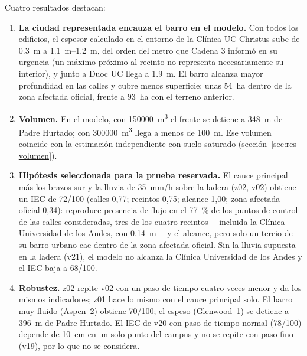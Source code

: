 Cuatro resultados destacan:
\begin{enumerate}
\item \textbf{La ciudad representada encauza el barro en el modelo.} Con todos los edificios, el espesor calculado en el entorno de la Clínica UC Christus sube de \SI{0,3}{m} a \SIrange{1,1}{1,2}{m}, del orden del metro que Cadena 3 informó en su urgencia (un máximo próximo al recinto no representa necesariamente su interior), y junto a Duoc UC llega a \SI{1,9}{m}. El barro alcanza mayor profundidad en las calles y cubre menos superficie: unas \SI{54}{ha} dentro de la zona afectada oficial, frente a \SI{93}{ha} con el terreno anterior.
\item \textbf{Volumen.} En el modelo, con \SI{150000}{m^3} el frente se detiene a \SI{348}{m} de Padre Hurtado; con \SI{300000}{m^3} llega a menos de \SI{100}{m}. Ese volumen coincide con la estimación independiente con suelo saturado (sección~\ref{sec:res-volumen}).
\item \textbf{Hipótesis seleccionada para la prueba reservada.} El cauce principal más los brazos sur y la lluvia de \SI{35}{mm/h} sobre la ladera (z02, v02) obtiene un IEC de 72/100 (calles 0,77; recintos 0,75; alcance 1,00; zona afectada oficial 0,34): reproduce presencia de flujo en el \SI{77}{\percent} de los puntos de control de las calles consideradas, tres de los cuatro recintos ---incluida la Clínica Universidad de los Andes, con \SI{0,14}{m}--- y el alcance, pero solo un tercio de su barro urbano cae dentro de la zona afectada oficial. Sin la lluvia supuesta en la ladera (v21), el modelo no alcanza la Clínica Universidad de los Andes y el IEC baja a 68/100.
\item \textbf{Robustez.} z02 repite v02 con un paso de tiempo cuatro veces menor y da los mismos indicadores; z01 hace lo mismo con el cauce principal solo. El barro muy fluido (Aspen~2) obtiene 70/100; el espeso (Glenwood~1) se detiene a \SI{396}{m} de Padre Hurtado. El IEC de v20 con paso de tiempo normal (78/100) depende de \SI{10}{cm} en un solo punto del campus y no se repite con paso fino (v19), por lo que no se considera.
\end{enumerate}

